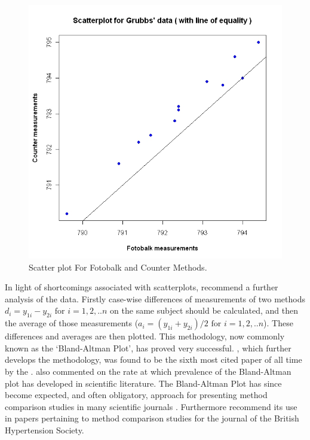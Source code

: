 \documentclass[12pt, a4paper]{report}
\begin{document}
	\begin{figure}[h!]
		\begin{center}
			\includegraphics[width=130mm]{images/GrubbsScatter.jpeg}
			\caption{Scatter plot For Fotobalk and Counter Methods.}\label{GrubbsScatter}
		\end{center}
	\end{figure}
	
	In light of shortcomings associated with scatterplots,
	\citet*{BA83} recommend a further analysis of the data. Firstly
	case-wise differences of measurements of two methods $d_{i} =
	y_{1i}-y_{2i} \mbox{ for }i=1,2,..n$ on the same subject should be
	calculated, and then the average of those measurements ($a_{i} =
	(y_{1i} + y_{2i})/2 \mbox{ for }i=1,2,..n$). These differences and
	averages are then plotted. This methodology, now commonly known as
	the `Bland-Altman Plot', has proved very successful.
	\citet*{BA86}, which further develops the methodology, was found
	to be the sixth most cited paper of all time by the
	\citet{BAcite}. \cite{Dewitte} also commented on the rate at which
	prevalence of the Bland-Altman plot has developed in scientific
	literature. The Bland-Altman Plot has since become expected, and
	often obligatory, approach for presenting method comparison
	studies in many scientific journals \citep{hollis}. Furthermore
	\citet{BritHypSoc} recommend its use in papers pertaining to
	method comparison studies for the journal of the British
	Hypertension Society.
	
\end{document}
